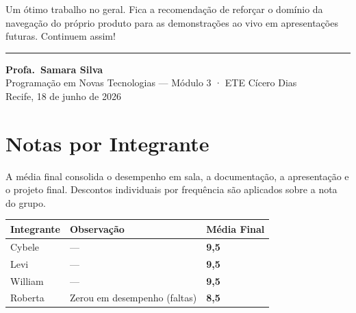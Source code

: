 \documentclass[
  sigconf,
  nonacm,
  language=portuguese
]{acmart}
\begin{document}
Um ótimo trabalho no geral. Fica a recomendação de reforçar o domínio da navegação do próprio produto para as demonstrações ao vivo em apresentações futuras. Continuem assim!

\vspace{1.5em}
\noindent\rule{\linewidth}{0.4pt}

\begin{flushright}
\textbf{Profa.\ Samara Silva}\\
{\small\color{cmuted} Programação em Novas Tecnologias --- Módulo 3 · ETE Cícero Dias}\\
{\small\color{cmuted} Recife, 18 de junho de 2026}
\end{flushright}

\appendix
\onecolumn
\section{Notas por Integrante}

A média final consolida o desempenho em sala, a documentação, a apresentação e o projeto final. Descontos individuais por frequência são aplicados sobre a nota do grupo.

\vspace{0.5em}
\begin{tabularx}{\linewidth}{@{} X p{3cm} p{2.5cm} @{}}
\toprule
\textbf{Integrante} & \textbf{Observação} & \textbf{Média Final} \\
\midrule
Cybele & --- & \textbf{9,5} \\
Levi & --- & \textbf{9,5} \\
William & --- & \textbf{9,5} \\
Roberta & Zerou em desempenho (faltas) & \textbf{8,5} \\
\bottomrule
\end{tabularx}
\end{document}
